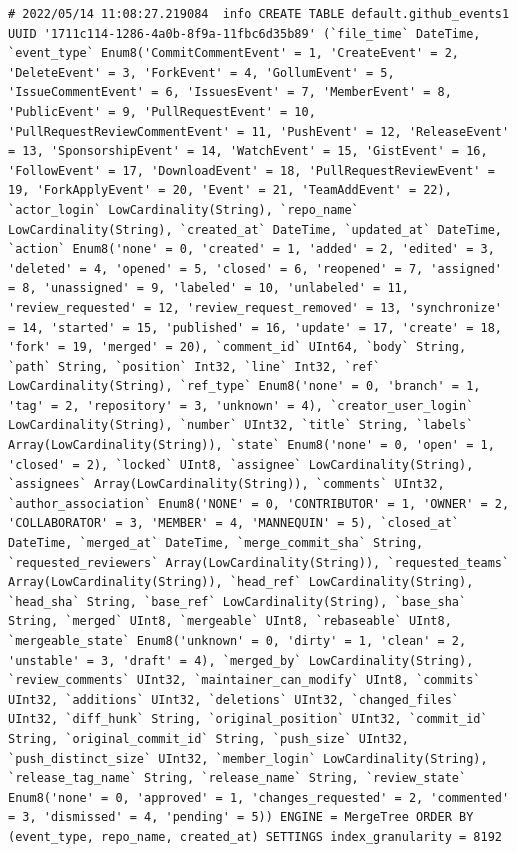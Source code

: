 \begin{verbatim}
# 2022/05/14 11:08:27.219084  info CREATE TABLE default.github_events1 UUID '1711c114-1286-4a0b-8f9a-11fbc6d35b89' (`file_time` DateTime, `event_type` Enum8('CommitCommentEvent' = 1, 'CreateEvent' = 2, 'DeleteEvent' = 3, 'ForkEvent' = 4, 'GollumEvent' = 5, 'IssueCommentEvent' = 6, 'IssuesEvent' = 7, 'MemberEvent' = 8, 'PublicEvent' = 9, 'PullRequestEvent' = 10, 'PullRequestReviewCommentEvent' = 11, 'PushEvent' = 12, 'ReleaseEvent' = 13, 'SponsorshipEvent' = 14, 'WatchEvent' = 15, 'GistEvent' = 16, 'FollowEvent' = 17, 'DownloadEvent' = 18, 'PullRequestReviewEvent' = 19, 'ForkApplyEvent' = 20, 'Event' = 21, 'TeamAddEvent' = 22), `actor_login` LowCardinality(String), `repo_name` LowCardinality(String), `created_at` DateTime, `updated_at` DateTime, `action` Enum8('none' = 0, 'created' = 1, 'added' = 2, 'edited' = 3, 'deleted' = 4, 'opened' = 5, 'closed' = 6, 'reopened' = 7, 'assigned' = 8, 'unassigned' = 9, 'labeled' = 10, 'unlabeled' = 11, 'review_requested' = 12, 'review_request_removed' = 13, 'synchronize' = 14, 'started' = 15, 'published' = 16, 'update' = 17, 'create' = 18, 'fork' = 19, 'merged' = 20), `comment_id` UInt64, `body` String, `path` String, `position` Int32, `line` Int32, `ref` LowCardinality(String), `ref_type` Enum8('none' = 0, 'branch' = 1, 'tag' = 2, 'repository' = 3, 'unknown' = 4), `creator_user_login` LowCardinality(String), `number` UInt32, `title` String, `labels` Array(LowCardinality(String)), `state` Enum8('none' = 0, 'open' = 1, 'closed' = 2), `locked` UInt8, `assignee` LowCardinality(String), `assignees` Array(LowCardinality(String)), `comments` UInt32, `author_association` Enum8('NONE' = 0, 'CONTRIBUTOR' = 1, 'OWNER' = 2, 'COLLABORATOR' = 3, 'MEMBER' = 4, 'MANNEQUIN' = 5), `closed_at` DateTime, `merged_at` DateTime, `merge_commit_sha` String, `requested_reviewers` Array(LowCardinality(String)), `requested_teams` Array(LowCardinality(String)), `head_ref` LowCardinality(String), `head_sha` String, `base_ref` LowCardinality(String), `base_sha` String, `merged` UInt8, `mergeable` UInt8, `rebaseable` UInt8, `mergeable_state` Enum8('unknown' = 0, 'dirty' = 1, 'clean' = 2, 'unstable' = 3, 'draft' = 4), `merged_by` LowCardinality(String), `review_comments` UInt32, `maintainer_can_modify` UInt8, `commits` UInt32, `additions` UInt32, `deletions` UInt32, `changed_files` UInt32, `diff_hunk` String, `original_position` UInt32, `commit_id` String, `original_commit_id` String, `push_size` UInt32, `push_distinct_size` UInt32, `member_login` LowCardinality(String), `release_tag_name` String, `release_name` String, `review_state` Enum8('none' = 0, 'approved' = 1, 'changes_requested' = 2, 'commented' = 3, 'dismissed' = 4, 'pending' = 5)) ENGINE = MergeTree ORDER BY (event_type, repo_name, created_at) SETTINGS index_granularity = 8192

\end{verbatim}
